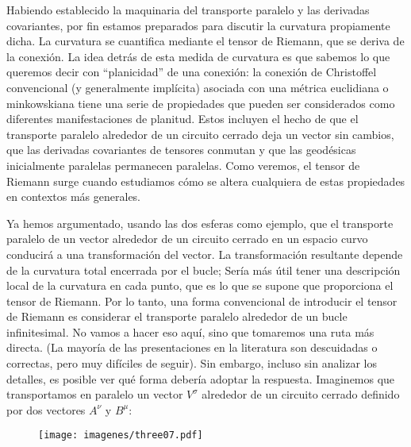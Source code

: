 \documentclass[11pt,b5paper,openany,twoside]{book}
\begin{document}
Habiendo establecido la maquinaria del transporte paralelo y las derivadas covariantes, por fin estamos preparados para discutir la curvatura propiamente dicha.
La curvatura se cuantifica mediante el tensor de Riemann, que se deriva de la conexión.
La idea detrás de esta medida de curvatura es que sabemos lo que queremos decir con ``planicidad'' de una conexión: la conexión de Christoffel convencional (y generalmente implícita) asociada con una métrica euclidiana o minkowskiana tiene una serie de propiedades que pueden ser considerados como diferentes manifestaciones de planitud.
Estos incluyen el hecho de que el transporte paralelo alrededor de un circuito cerrado deja un vector sin cambios, que las derivadas covariantes de tensores conmutan y que las geodésicas inicialmente paralelas permanecen paralelas.
Como veremos, el tensor de Riemann surge cuando estudiamos cómo se altera cualquiera de estas propiedades en contextos más generales.

Ya hemos argumentado, usando las dos esferas como ejemplo, que el transporte paralelo de un vector alrededor de un circuito cerrado en un espacio curvo conducirá a una transformación del vector.
La transformación resultante depende de la curvatura total encerrada por el bucle; Sería más útil tener una descripción local de la curvatura en cada punto, que es lo que se supone que proporciona el tensor de Riemann.
Por lo tanto, una forma convencional de introducir el tensor de Riemann es considerar el transporte paralelo alrededor de un bucle infinitesimal.
No vamos a hacer eso aquí, sino que tomaremos una ruta más directa.
(La mayoría de las presentaciones en la literatura son descuidadas o correctas, pero muy difíciles de seguir).
Sin embargo, incluso sin analizar los detalles, es posible ver qué forma debería adoptar la respuesta.
Imaginemos que transportamos en paralelo un vector $V^\sigma$ alrededor de un circuito cerrado definido por dos vectores $A^\nu$ y $B^\mu$:

\begin{figure}[h]
\centering
\texttt{[image: imagenes/three07.pdf]}
\end{figure}
\end{document}
